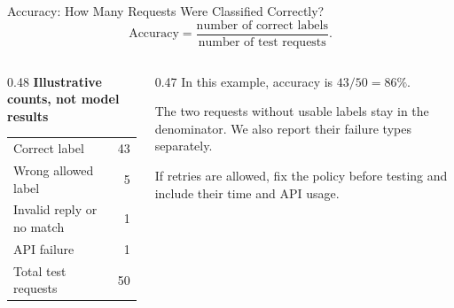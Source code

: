 \documentclass[aspectratio=169]{beamer}
\begin{document}
\begin{frame}{Accuracy: How Many Requests Were Classified Correctly?}
  \[
    \text{Accuracy}=\frac{\text{number of correct labels}}{\text{number of test requests}}.
  \]
  \begin{columns}[T,onlytextwidth]
    \begin{column}{0.48\linewidth}
      \small\textbf{Illustrative counts, not model results}
      \par\vspace{0.4em}
      \renewcommand{\arraystretch}{1.2}
      \begin{tabular}{@{}lr@{}}
        \toprule
        Correct label & 43 \\
        Wrong allowed label & 5 \\
        Invalid reply or no match & 1 \\
        API failure & 1 \\
        \midrule
        Total test requests & 50 \\
        \bottomrule
      \end{tabular}
    \end{column}
    \begin{column}{0.47\linewidth}
      \small
      In this example, accuracy is $43/50=86\%$.
      \par\vspace{0.7em}
      The two requests without usable labels stay in the denominator. We also report their failure types separately.
      \par\vspace{0.7em}
      If retries are allowed, fix the policy before testing and include their time and API usage.
    \end{column}
  \end{columns}
\end{frame}
\end{document}
